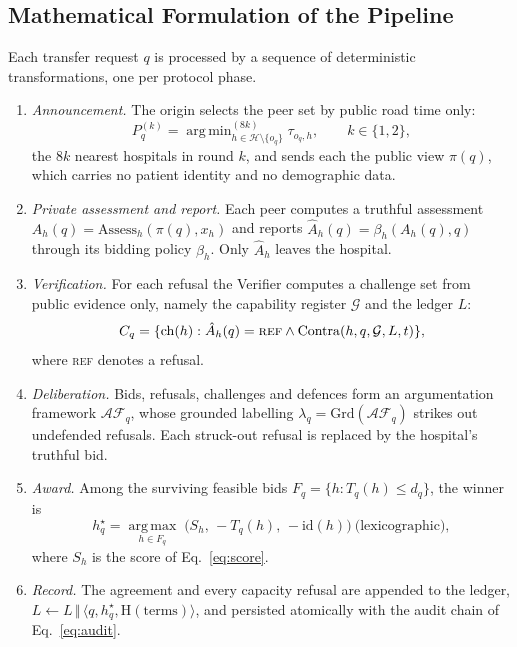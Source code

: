 \subsection{Mathematical Formulation of the Pipeline}
\label{sec:pipeline}
Each transfer request $q$ is processed by a sequence of deterministic transformations, one per protocol phase.
\begin{enumerate}
\setlength{\itemsep}{2pt}
\item \emph{Announcement.} The origin selects the peer set by public road time only:
\begin{equation}
  P_q^{(k)} = \operatorname{arg\,min}^{(8k)}_{h\in\mathcal{H}\setminus\{o_q\}} \tau_{o_q,h},\qquad k\in\{1,2\},
  \label{eq:peers}
\end{equation}
the $8k$ nearest hospitals in round $k$, and sends each the public view $\pi(q)$, which carries no patient identity and no demographic data.
\item \emph{Private assessment and report.} Each peer computes a truthful assessment $A_h(q)=\mathrm{Assess}_h(\pi(q),x_h)$ and reports $\hat{A}_h(q)=\beta_h(A_h(q),q)$ through its bidding policy $\beta_h$. Only $\hat{A}_h$ leaves the hospital.
\item \emph{Verification.} For each refusal the Verifier computes a challenge set from public evidence only, namely the capability register $\mathcal{G}$ and the ledger $L$:
\begin{equation}
  C_q = \{\mathrm{ch}(h) : \hat{A}_h(q)=\textsc{ref} \wedge \mathrm{Contra}(h,q,\mathcal{G},L,t)\},
  \label{eq:challenges}
\end{equation}
where \textsc{ref} denotes a refusal.
\item \emph{Deliberation.} Bids, refusals, challenges and defences form an argumentation framework $\mathcal{AF}_q$, whose grounded labelling $\lambda_q=\mathrm{Grd}(\mathcal{AF}_q)$ strikes out undefended refusals. Each struck-out refusal is replaced by the hospital's truthful bid.
\item \emph{Award.} Among the surviving feasible bids $F_q=\{h:T_q(h)\le d_q\}$, the winner is
\begin{equation}
  h_q^\star=\operatorname*{arg\,max}_{h\in F_q}\;\bigl(S_h,\,-T_q(h),\,-\mathrm{id}(h)\bigr)\ \text{(lexicographic)},
  \label{eq:award}
\end{equation}
where $S_h$ is the score of Eq.~\eqref{eq:score}.
\item \emph{Record.} The agreement and every capacity refusal are appended to the ledger, $L\leftarrow L\,\Vert\,\langle q,h_q^\star,\mathrm{H}(\text{terms})\rangle$, and persisted atomically with the audit chain of Eq.~\eqref{eq:audit}.
\end{enumerate}

